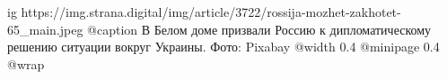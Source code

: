  
 
 
 
 

\ifcmt
  ig https://img.strana.digital/img/article/3722/rossija-mozhet-zakhotet-65_main.jpeg
  @caption В Белом доме призвали Россию к дипломатическому решению ситуации вокруг Украины. Фото: Pixabay
  @width 0.4
  @minipage 0.4
  @wrap \parpic[r]
\fi
